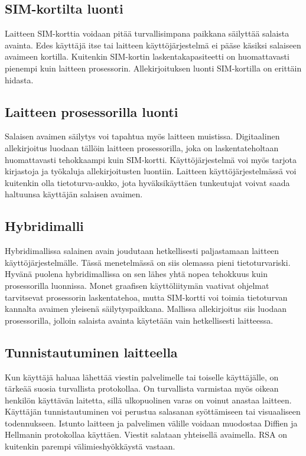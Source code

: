 \documentclass[finnish]{tktltiki2}
\theoremstyle{definition}
\theoremstyle{remark}
\begin{document}
\subsection{SIM-kortilta luonti}

Laitteen SIM-korttia voidaan pitää turvallisimpana paikkana säilyttää salaista avainta. Edes käyttäjä itse tai laitteen käyttöjärjestelmä ei pääse käsiksi salaiseen avaimeen kortilla. Kuitenkin SIM-kortin laskentakapasiteetti on huomattavasti pienempi kuin laitteen prosessorin. Allekirjoituksen luonti SIM-kortilla on erittäin hidasta.   

\subsection{Laitteen prosessorilla luonti}

Salaisen avaimen säilytys voi tapahtua myös laitteen muistissa. Digitaalinen allekirjoitus luodaan tällöin laitteen prosessorilla, joka on laskentateholtaan huomattavasti tehokkaampi kuin SIM-kortti. Käyttöjärjestelmä voi myös tarjota kirjastoja ja työkaluja allekirjoitusten luontiin. Laitteen käyttöjärjestelmässä voi kuitenkin olla tietoturva-aukko, jota hyväksikäyttäen tunkeutujat voivat saada haltuunsa käyttäjän salaisen avaimen.

\subsection{Hybridimalli}

Hybridimallissa salainen avain joudutaan hetkellisesti paljastamaan laitteen käyttöjärjestelmälle. Tässä menetelmässä on siis olemassa pieni tietoturvariski. Hyvänä puolena hybridimallissa on sen lähes yhtä nopea tehokkuus kuin prosessorilla luonnissa. Monet graafisen käyttöliitymän vaativat ohjelmat tarvitsevat prosessorin laskentatehoa, mutta SIM-kortti voi toimia tietoturvan kannalta avaimen yleisenä säilytyspaikkana. Mallissa allekirjoitus siis luodaan prosessorilla, jolloin salaista avainta käytetään vain hetkellisesti laitteessa.



\subsection{Tunnistautuminen laitteella}
Kun käyttäjä haluaa lähettää viestin palvelimelle tai toiselle käyttäjälle, on tärkeää suosia turvallista protokollaa. On turvallista varmistaa myös oikean henkilön käyttävän laitetta, sillä ulkopuolinen varas on voinut anastaa laitteen. Käyttäjän tunnistautuminen voi perustua salasanan syöttämiseen tai visuaaliseen todennukseen. Istunto laitteen ja palvelimen välille voidaan muodostaa Diffien ja Hellmanin protokollaa käyttäen. Viestit salataan yhteisellä avaimella. RSA on kuitenkin parempi välimieshyökkäystä vastaan.
\end{document}
